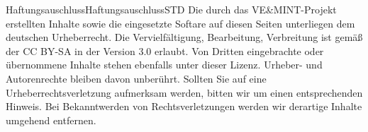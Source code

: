\begin{MXContent}{Haftungsauschluss}{Haftungsauschluss}{STD}
Die durch das VE\&MINT-Projekt erstellten Inhalte sowie die eingesetzte Softare auf diesen Seiten unterliegen dem deutschen Urheberrecht.
Die Vervielfältigung, Bearbeitung, Verbreitung ist gemäß der  CC BY-SA in der Version 3.0 erlaubt.
Von Dritten eingebrachte oder übernommene Inhalte stehen ebenfalls unter dieser Lizenz. Urheber- und Autorenrechte bleiben davon unberührt.
Sollten Sie auf eine Urheberrechtsverletzung aufmerksam werden, bitten wir um einen entsprechenden Hinweis. Bei Bekanntwerden von Rechtsverletzungen werden wir derartige Inhalte umgehend entfernen. 
\end{MXContent}




